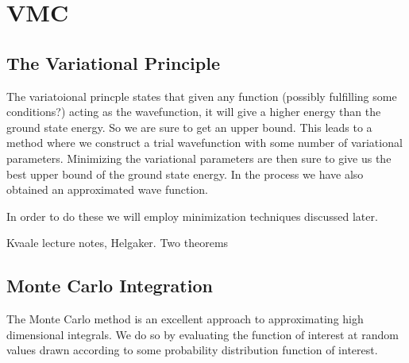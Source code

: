 \documentclass[twoside,english]{uiofysmaster}
\begin{document}
\section{VMC}
\subsection{The Variational Principle}
The variatoional princple states that given any function (possibly fulfilling some conditions?) acting as the wavefunction, it will give a higher energy than the ground state energy. So we are sure to get an upper bound. This leads to a method where we construct a trial wavefunction with some number of variational parameters. Minimizing the variational parameters are then sure to give us the best upper bound of the ground state energy. In the process we have also obtained an approximated wave function. 

In order to do these we will employ minimization techniques discussed later.

Kvaale lecture notes, Helgaker. Two theorems

\subsection{Monte Carlo Integration}
The Monte Carlo method is an excellent approach to approximating high dimensional integrals. We do so by evaluating the function of interest at random values drawn according to some probability distribution function of interest. 
\end{document}
